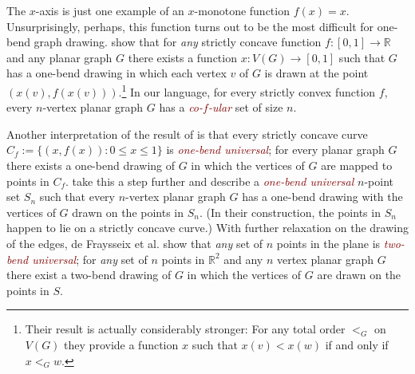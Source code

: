 \documentclass{article}
\newcommand{\R}{\mathbb{R}}
\newcommand{\defin}[1]{\emph{\textcolor{Maroon}{#1}}}
\theoremstyle{definition}
\begin{document}
The $x$-axis is just one example of an $x$-monotone function $f(x)=x$. Unsurprisingly, perhaps, this function turns out to be the most difficult for one-bend graph drawing.
\citet{DBLP:journals/comgeo/GiacomoDLW05} show that for \emph{any} strictly concave function $f:[0,1]\to\R$ and any planar graph $G$ there exists a function $x:V(G)\to[0,1]$ such that $G$
has a one-bend drawing in which each vertex $v$ of $G$ is drawn at the point $(x(v),f(x(v)))$.\footnote{Their result is actually considerably stronger: For any total order $<_G$ on $V(G)$ they provide a function $x$ such that $x(v) < x(w)$ if and only if $x<_G w$.} In our language, for every strictly convex function $f$, every $n$-vertex planar graph $G$ has a \defin{co-$f$-ular} set of size $n$.


Another interpretation of the result of \citet{DBLP:journals/comgeo/GiacomoDLW05} is that every strictly concave curve $C_f:=\{(x,f(x)):0\le x\le 1\}$ is \defin{one-bend universal}; for every planar graph $G$ there exists a one-bend drawing of $G$ in which the vertices of $G$ are mapped to points in $C_f$. \citet{DBLP:conf/gd/EverettLLW07} take this a step further and describe a \defin{one-bend universal} $n$-point set $S_n$ such that every $n$-vertex planar graph $G$ has a one-bend drawing with the vertices of $G$ drawn on the points in $S_n$. (In their construction, the points in $S_n$ happen to lie on a strictly concave curve.)
With further relaxation on the drawing of the edges, de Fraysseix et al. \cite{DBLP:journals/combinatorica/FraysseixPP90} show that \emph{any} set of $n$ points in the plane is \defin{two-bend universal}; for \emph{any} set of $n$ points in $\R^2$ and any $n$ vertex planar graph $G$ there exist a two-bend drawing of $G$ in which the vertices of $G$ are drawn on the points in $S$.
\end{document}
